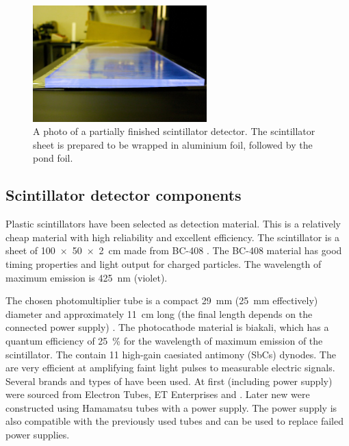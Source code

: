 \begin{figure}
    \centering
    \includegraphics[width=0.6\textwidth]
                    {plots/station/ADL_115651.jpg}
    \caption{A photo of a partially finished scintillator detector. The scintillator sheet is prepared to be wrapped in aluminium foil, followed by the pond foil.}
    \label{fig:scintillator_detector}
\end{figure}


\subsection{Scintillator detector components}

Plastic scintillators have been selected as detection material. This is a relatively cheap material with high reliability and excellent efficiency. The scintillator is a sheet of \SI[product-units=power]{100 x 50 x 2}{\centi\meter} made from BC-408 \cite{sgc2011bc408}. The BC-408 material has good timing properties and light output for charged particles. The wavelength of maximum emission is \SI{425}{\nano\meter} (violet).

The chosen photomultiplier tube \cite{et2010pmt} is a compact \SI{29}{\milli\meter} (\SI{25}{\milli\meter} effectively) diameter and approximately \SI{11}{\centi\meter} long (the final length depends on the connected power supply) \pmt. The photocathode material is biakali, which has a quantum efficiency of \SI{25}{\percent} for the wavelength of maximum emission of the scintillator. The \pmts contain 11 high-gain caesiated antimony (SbCs) dynodes. The \pmts are very efficient at amplifying faint light pulses to measurable electric signals. Several brands and types of \pmts have been used. At first \pmts (including power supply) were sourced from Electron Tubes, ET Enterprises and \senstech. Later new \pmts were constructed using Hamamatsu tubes with a \nikhef power supply. The \nikhef \pmt power supply is also compatible with the previously used tubes and can be used to replace failed power supplies.

